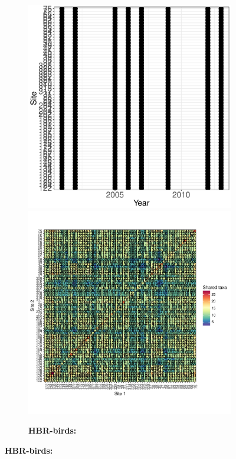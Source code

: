 \documentclass[11pt, oneside]{article}
\begin{document}
\begin{figure}[h!]
\begin{figure}[h!]
\includegraphics[scale = 0.4]{hbr-birds-sillett_spatiotemporal_sampling_effort.pdf}
\includegraphics[scale = 0.4]{hbr-birds-sillett_spp_shared.pdf}
\caption{{\bf HBR-birds:} }
\label{hbr-birds}
\end{figure}


\end{figure}
\end{document}
